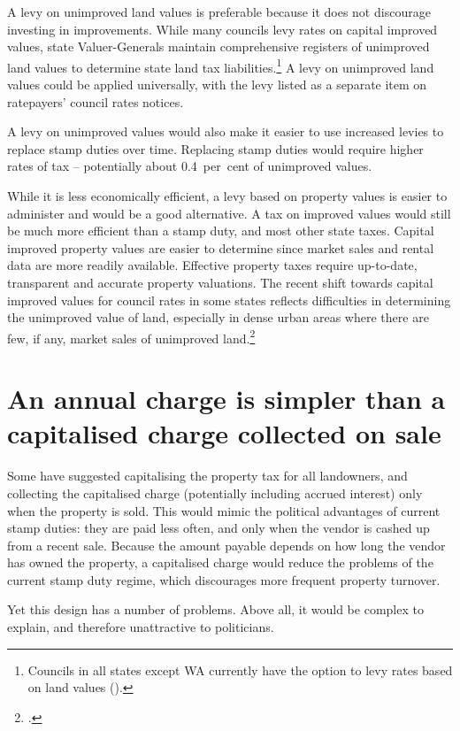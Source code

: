 \documentclass[twoside,english]{palatinob5ona4portrait}
\begin{document}
A levy on unimproved land values is preferable because it does not discourage investing in improvements. While many councils levy rates on capital improved values, state Valuer-Generals maintain comprehensive registers of unimproved land values to determine state land tax liabilities.\footnote{Councils in all states except WA currently have the option to levy rates based on land values ().}  A levy on unimproved land values could be applied universally, with the levy listed as a separate item on ratepayers’ council rates notices.

A levy on unimproved values would also make it easier to use increased levies to replace stamp duties over time. Replacing stamp duties would require higher rates of tax – potentially about 0.4~per~cent of unimproved values. 

While it is less economically efficient, a levy based on property values is easier to administer and would be a good alternative. A tax on improved values would still be much more efficient than a stamp duty, and most other state taxes. Capital improved property values are easier to determine since market sales and rental data are more readily available. Effective property taxes require up-to-date, transparent and accurate property valuations. The recent shift towards capital improved values for council rates in some states reflects difficulties in determining the unimproved value of land, especially in dense urban areas where there are few, if any, market sales of unimproved land.\footcites[][24]{Ombudsman2005}[][153]{HefferanBoyd2010}

\section{\label{sec:PROP-6-4}An annual charge is simpler than a capitalised charge collected on sale}
Some have suggested capitalising the property tax for all landowners, and collecting the capitalised charge (potentially including accrued interest) only when the property is sold.  This would mimic the political advantages of current stamp duties: they are paid less often, and only when the vendor is cashed up from a recent sale. Because the amount payable depends on how long the vendor has owned the property, a capitalised charge would reduce the problems of the current stamp duty regime, which discourages more frequent property turnover.

Yet this design has a number of problems. Above all, it would be complex to explain, and therefore unattractive to politicians. 
\end{document}
